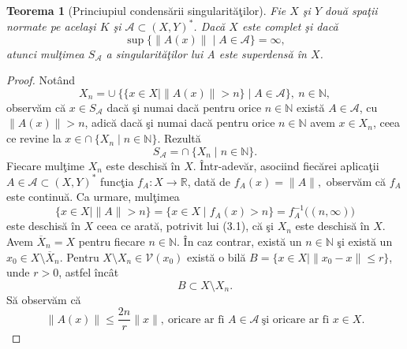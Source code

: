 \documentclass[a4paper,openany,12pt]{report}
\newtheorem{theorem}{Teorema}[section]
\begin{document}
\begin{theorem}[Princiupiul condens\u arii singularit\u a\c tilor]
Fie $X$ \c si $Y$ dou\u a spa\c tii normate pe acela\c si $K$ \c si $\mathcal{A} \subset (X, Y)^*$. Dac\u a $X$ este complet \c si dac\u a 
\begin{equation*}
\sup\{\|A(x)\| \mid A \in \mathcal{A}\} = \infty,
\end{equation*}atunci mul\c timea $S_{\mathcal{A}}$ a singularit\u a\c tilor lui A este superdens\u a \^ in $X$.
\end{theorem}
\begin{proof}
Not\^ and
\begin{equation}
X_n = \cup\: \big\{ \{ x \in X \mid \|A(x)\| > n \}\mid A \in \mathcal{A}\big\},\: n \in \mathbb{N},
\end{equation}
observ\u am c\u a $x \in S_{\mathcal{A}}$ dac\u a \c si numai dac\u a pentru orice $n\in \mathbb{N}$ exist\u a $A \in \mathcal{A}$, cu $\|A(x)\| > n$, adic\u a dac\u a \c si numai dac\u a pentru orice $n\in \mathbb{N}$ avem $x \in X_n$, ceea ce revine la $x \in \cap\: \{X_n \mid n \in \mathbb{N}\}$. Rezult\u a
\begin{equation}
S_\mathcal{A} = \cap\: \{X_n \mid n \in \mathbb{N}\}.
\end{equation}
Fiecare mul\c time $X_n$ este deschis\u a \^ in $X$. \^ Intr-adev\u ar, asociind fiec\u arei aplica\c tii $A \in \mathcal{A} \subset (X, Y)^*$ func\c tia $f_A : X \rightarrow \mathbb{R}$, dat\u a de $f_A(x) = \|A\|,$ observ\u am c\u a $f_A$ este continu\u a. Ca urmare, mul\c timea
\begin{equation*}
\{x \in X \mid \|A\| > n\}=\{x \in X \mid f_A(x) >n\} = f_A^{-1}\big((n, \infty)\big)
\end{equation*}
este deschis\u a \^ in $X$ ceea ce arat\u a, potrivit lui (3.1), c\u a \c si $X_n$ este deschis\u a \^ in $X$.
\newline \quad
\newline Avem $\overline{X}_n = X$ pentru fiecare $n\in \mathbb{N}$. \^ In caz contrar, exist\u a un $n\in \mathbb{N}$ \c si exist\u a un $x_0 \in X\setminus \overline{X}_n$. Pentru $X \setminus X_n \in\mathcal{V}(x_0)$ exist\u a o bil\u a $B = \big\{x \in X \mid \| x_0-x\| \leq r\big\}$, unde $r>0$, astfel \^ inc\^ at
\begin{equation}
B \subset X \setminus X_n.
\end{equation}
S\u a observ\u am c\u a
\begin{equation}
\|A(x)\| \leq \frac{2n}{r}\|x\|, \: \text{oricare ar fi }A \in \mathcal{A} \: \text{\c si oricare ar fi } x \in X.

\end{equation}
\end{proof}
\end{document}
